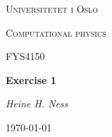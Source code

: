
\pagestyle{plain}

\begin{titlepage}
	\vspace*{3cm}
	\centering
	{\scshape\LARGE Universitetet i Oslo\par}
	\vspace{1cm}
	{\scshape\Large Computational physics\par}
	\vspace{0.5cm}
	{\scshape\Large FYS4150\par}
	\vspace{1.5cm}
	{\huge\bfseries Exercise 1\par}
	\vspace{2cm}
	{\Large\itshape Heine H. Ness \par}

	\vfill

	{\large \today\par}
\end{titlepage}
